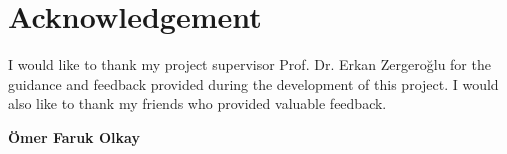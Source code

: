 \chapter*{Acknowledgement}

I would like to thank my project supervisor Prof. Dr. Erkan Zergeroğlu for the guidance and feedback provided during the development of this project. I would also like to thank my friends who provided valuable feedback.


\vspace{1cm}
\begin{flushright}
\textbf{Ömer Faruk Olkay}
\end{flushright}
\clearpage
